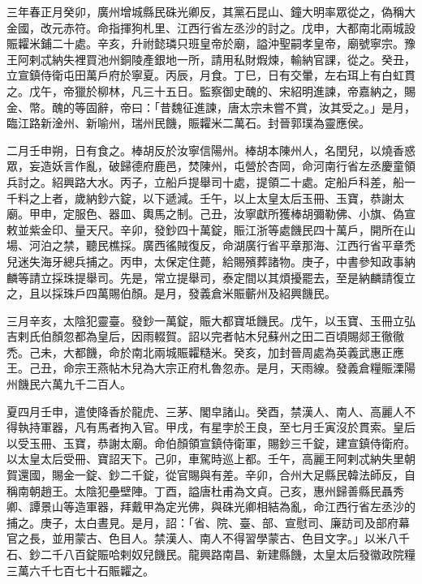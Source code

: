 \begin{pinyinscope}
 三年春正月癸卯，廣州增城縣民硃光卿反，其黨石昆山、鐘大明率眾從之，偽稱大金國，改元赤符。命指揮狗札里、江西行省左丞沙的討之。戊申，大都南北兩城設賑糶米鋪二十處。辛亥，升祔懿璘只班皇帝於廟，謚沖聖嗣孝皇帝，廟號寧宗。豫王阿剌忒納失裡買池州銅陵產銀地一所，請用私財煆煉，輸納官課，從之。癸丑，立宣鎮侍衛屯田萬戶府於寧夏。丙辰，月食。丁巳，日有交暈，左右珥上有白虹貫之。戊午，帝獵於柳林，凡三十五日。監察御史醜的、宋紹明進諫，帝嘉納之，賜金、幣。醜的等固辭，帝曰：「昔魏征進諫，唐太宗未嘗不賞，汝其受之。」是月，臨江路新淦州、新喻州，瑞州民饑，賑糶米二萬石。封晉郭璞為靈應侯。



 二月壬申朔，日有食之。棒胡反於汝寧信陽州。棒胡本陳州人，名閏兒，以燒香惑眾，妄造妖言作亂，破歸德府鹿邑，焚陳州，屯營於杏岡，命河南行省左丞慶童領兵討之。紹興路大水。丙子，立船戶提舉司十處，提領二十處。定船戶科差，船一千料之上者，歲納鈔六錠，以下遞減。壬午，以上太皇太后玉冊、玉寶，恭謝太廟。甲申，定服色、器皿、輿馬之制。己丑，汝寧獻所獲棒胡彌勒佛、小旗、偽宣敕並紫金印、量天尺。辛卯，發鈔四十萬錠，賑江浙等處饑民四十萬戶，開所在山場、河泊之禁，聽民樵採。廣西徭賊復反，命湖廣行省平章那海、江西行省平章禿兒迷失海牙總兵捕之。丙申，太保定住薨，給賜殯葬諸物。庚子，中書參知政事納麟等請立採珠提舉司。先是，常立提舉司，泰定間以其煩擾罷去，至是納麟請復立之，且以採珠戶四萬賜伯顏。是月，發義倉米賑蘄州及紹興饑民。



 三月辛亥，太陰犯靈臺。發鈔一萬錠，賑大都寶坻饑民。戊午，以玉寶、玉冊立弘吉剌氏伯顏忽都為皇后，因雨輟賀。詔以完者帖木兒蘇州之田二百頃賜郯王徹徹禿。己未，大都饑，命於南北兩城賑糶糙米。癸亥，加封晉周處為英義武惠正應王。己丑，命宗王燕帖木兒為大宗正府札魯忽赤。是月，天雨線。發義倉糧賑溧陽州饑民六萬九千二百人。



 夏四月壬申，遣使降香於龍虎、三茅、閣皁諸山。癸酉，禁漢人、南人、高麗人不得執持軍器，凡有馬者拘入官。甲戌，有星孛於王良，至七月壬寅沒於貫索。皇后以受玉冊、玉寶，恭謝太廟。命伯顏領宣鎮侍衛軍，賜鈔三千錠，建宣鎮侍衛府。以太皇太后受冊、寶詔天下。己卯，車駕時巡上都。壬午，高麗王阿剌忒納失里朝賀還國，賜金一錠、鈔二千錠，從官賜與有差。辛卯，合州大足縣民韓法師反，自稱南朝趙王。太陰犯壘壁陣。丁酉，謚唐杜甫為文貞。己亥，惠州歸善縣民聶秀卿、譚景山等造軍器，拜戴甲為定光佛，與硃光卿相結為亂，命江西行省左丞沙的捕之。庚子，太白晝見。是月，詔：「省、院、臺、部、宣慰司、廉訪司及部府幕官之長，並用蒙古、色目人。禁漢人、南人不得習學蒙古、色目文字。」以米八千石、鈔二千八百錠賑哈剌奴兒饑民。龍興路南昌、新建縣饑，太皇太后發徽政院糧三萬六千七百七十石賑糶之。




\end{pinyinscope}
